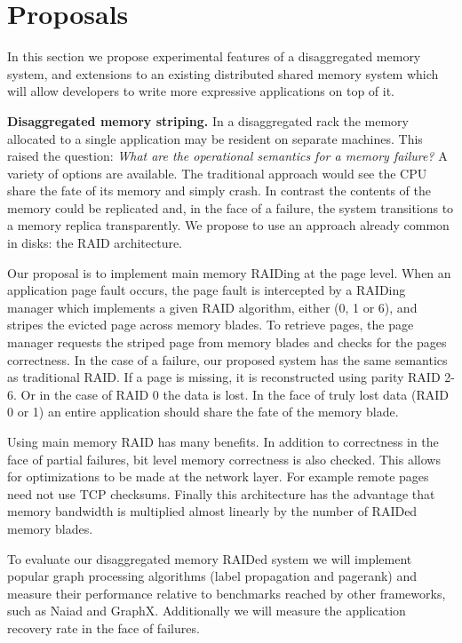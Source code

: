 \section{Proposals}
\label{sec:proposal}
In this section we propose experimental features of a disaggregated
memory system, and extensions to an existing distributed shared memory
system which will allow developers to write more expressive
applications on top of it.


\textbf{Disaggregated memory striping.} In a disaggregated
rack the memory allocated to a single application may be resident on
separate machines. This raised the question: \emph{What are the operational
semantics for a memory failure?} A variety of
options are available. The traditional approach would see the
CPU share the fate of its memory and simply crash. In
contrast the contents of the memory could be replicated and, in the
face of a failure, the system transitions to a memory replica transparently.
We propose to use an approach already common in disks: the RAID
architecture.

Our proposal is to implement main memory RAIDing at the page level.
When an application page fault occurs, the page fault is intercepted
by a RAIDing manager which implements a given RAID algorithm, either
(0, 1 or 6), and stripes the evicted page across memory blades. To
retrieve pages, the page manager requests the striped page from memory
blades and checks for the pages correctness. In the case of a failure,
our proposed system has the same semantics as traditional RAID. If a
page is missing, it is reconstructed using parity RAID 2-6. Or in the
case of RAID 0 the data is lost. In the face of truly lost data (RAID
0 or 1) an entire application should share the fate of the memory
blade.

Using main memory RAID has many benefits. In addition to correctness
in the face of partial failures, bit level memory correctness is also
checked.  This allows for optimizations to be made at the network
layer. For example remote pages need not use TCP checksums. Finally
this architecture has the advantage that memory bandwidth is
multiplied almost linearly by the number of RAIDed memory blades.

To evaluate our disaggregated memory RAIDed system we will implement
popular graph processing algorithms (label propagation and pagerank)
and measure their performance relative to benchmarks reached by other
frameworks, such as Naiad and GraphX. Additionally we will measure
the application recovery rate in the face of failures. 

